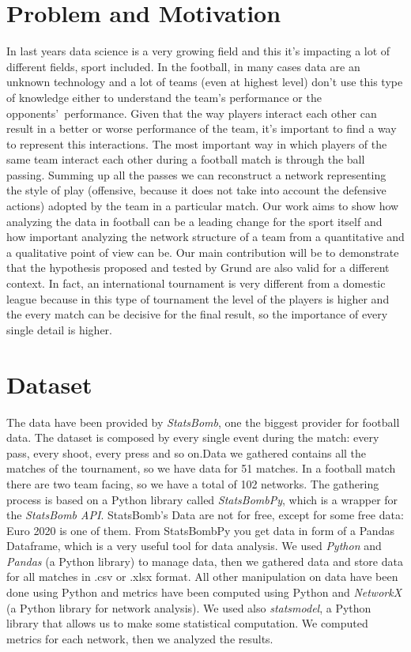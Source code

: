 \documentclass[12pt, a4paper]{article}
\begin{document}
\section{Problem and Motivation}
\label{problem-and-motivation}
In last years data science is a very growing field and this it's impacting a lot of different fields, sport included. In the football, in many cases data are an unknown technology and a lot of teams (even at highest level) don’t use this type of knowledge either to understand the team’s performance or the opponents’ performance. Given that the way players interact each other can result in a better or worse performance of the team, it's important to find a way to represent this interactions. The most important way in which players of the same team interact each other during a football match is through the ball passing. Summing up all the passes we can reconstruct a network representing the style of play (offensive, because it does not take into account the defensive actions) adopted by the team in a particular match. Our work aims to show how analyzing the data in football can be a leading change for the sport itself and how important analyzing the network structure of a team from a quantitative and a qualitative point of view can be. Our main contribution will be to demonstrate that the hypothesis proposed and tested by Grund \cite{GRUND} are also valid for a different context. In fact, an international tournament is very different from a domestic league because in this type of tournament the level of the players is higher and the every match can be decisive for the final result, so the importance of every single detail is higher.  


\section{Dataset}
\label{dataset}
The data have been provided by \emph{StatsBomb}, one the biggest provider for football data. The dataset is composed by every single event during the match: every pass, every shoot, every press and so on.Data we gathered contains all the matches of the tournament, so we have data for 51 matches. In a football match there are two team facing, so we have a total of 102 networks. 
The gathering process is based on a Python library called \emph{StatsBombPy}, which is a wrapper for the \emph{StatsBomb API}. 
StatsBomb's Data are not for free, except for some free data: Euro 2020 is one of them. From StatsBombPy you get data in form of a Pandas Dataframe, which is a very useful tool for data analysis. We used \emph{Python} and \emph{Pandas} (a Python library) to manage data, then we gathered data and store data for all matches in .csv or .xlsx format. All other manipulation on data have been done using Python and metrics have been computed using Python and \emph{NetworkX} (a Python library for network analysis). We used also \emph{statsmodel}, a Python library that allows us to make some statistical computation.  We computed metrics for each network, then we analyzed the results.
\end{document}

